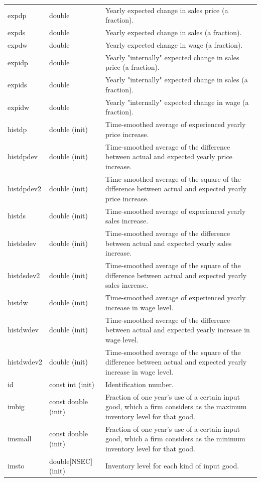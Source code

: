 \documentclass{article}
\begin{document}
\begin{longtable}{p{}p{}p{}}
expdp & double & Yearly expected change in sales price (a fraction).\\
expds & double & Yearly expected change in sales (a fraction).\\
expdw & double & Yearly expected change in wage (a fraction).\\
expidp & double & Yearly "internally" expected change in sales price (a fraction).\\
expids & double & Yearly "internally" expected change in sales (a fraction).\\
expidw & double & Yearly "internally" expected change in wage (a fraction).\\
histdp & double (init) & Time-smoothed average of experienced yearly price increase.\\
histdpdev & double (init) & Time-smoothed average of the difference between actual and expected yearly price increase.\\
histdpdev2 & double (init) & Time-smoothed average of the square of the difference between actual and expected yearly price increase.\\
histds & double (init) & Time-smoothed average of experienced yearly sales increase.\\
histdsdev & double (init) & Time-smoothed average of the difference between actual and expected yearly sales increase.\\
histdsdev2 & double (init) & Time-smoothed average of the square of the difference between actual and expected yearly sales increase.\\
histdw & double (init) & Time-smoothed average of experienced yearly increase in wage level.\\
histdwdev & double (init) & Time-smoothed average of the difference between actual and expected yearly increase in wage level.\\
histdwdev2 & double (init) & Time-smoothed average of the square of the difference between actual and expected yearly increase in wage level.\\
id & const int (init) & Identification number.\\
imbig & const double (init) & Fraction of one year's use of a certain input good, which a firm considers as the maximum inventory level for that good.\\
imsmall & const double (init) & Fraction of one year's use of a certain input good, which a firm considers as the minimum inventory level for that good.\\
imsto & double[NSEC] (init) & Inventory level for each kind of input good.\\

\end{longtable}
\end{document}
